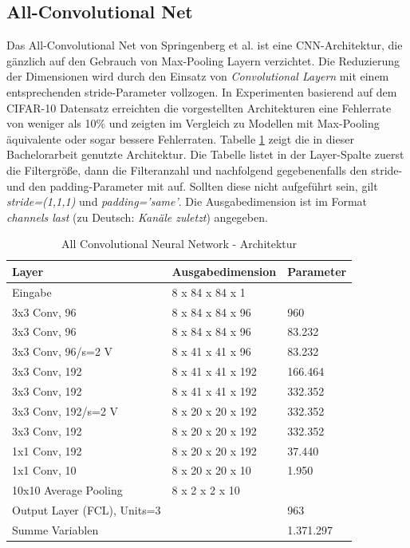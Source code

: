  
\subsection{All-Convolutional Net}
Das All-Convolutional Net von Springenberg et al. \parencite{DBLP:journals/corr/SpringenbergDBR14} ist eine CNN-Architektur, die g\"anzlich auf den Gebrauch von Max-Pooling Layern verzichtet. Die Reduzierung der Dimensionen wird durch den Einsatz von \textit{Convolutional Layern} mit einem entsprechenden stride-Parameter vollzogen. In Experimenten basierend auf dem CIFAR-10 Datensatz erreichten die vorgestellten Architekturen eine Fehlerrate von weniger als 10\% und zeigten im Vergleich zu Modellen mit Max-Pooling äquivalente oder sogar bessere Fehlerraten. Tabelle \ref{tb:arch_allcnn} zeigt die in dieser Bachelorarbeit genutzte Architektur. Die Tabelle listet in der Layer-Spalte zuerst die Filtergr\"o\ss{}e, dann die Filteranzahl und nachfolgend gegebenenfalls den stride- und den padding-Parameter mit auf. Sollten diese nicht aufgef\"uhrt sein, gilt \textit{stride=(1,1,1)} und \textit{padding='same'}. Die Ausgabedimension ist im Format \textit{channels last} (zu Deutsch: \textit{Kanäle zuletzt}) angegeben. 

\begin{table}
\centering
\caption{All Convolutional Neural Network - Architektur}
\begin{tabular}{@{}lll@{}}
\hline
Layer & Ausgabedimension & Parameter\\
\hline
Eingabe & 8 x 84 x 84 x 1 & \\
3x3 Conv, 96 & 8 x 84 x 84 x 96 & 960\\
3x3 Conv, 96 & 8 x 84 x 84 x 96 & 83.232\\ 
3x3 Conv, 96/s=2 V & 8 x 41 x 41 x 96 & 83.232\\ 
3x3 Conv, 192 & 8 x 41 x 41 x 192 & 166.464\\
3x3 Conv, 192 & 8 x 41 x 41 x 192 & 332.352\\
3x3 Conv, 192/s=2 V & 8 x 20 x 20 x 192 & 332.352\\
3x3 Conv, 192 & 8 x 20 x 20 x 192 & 332.352\\
1x1 Conv, 192 & 8 x 20 x 20 x 192 & 37.440\\
1x1 Conv, 10 & 8 x 20 x 20 x 10 & 1.950\\
10x10 Average Pooling & 8 x 2 x 2 x 10 & \\
Output Layer (FCL), Units=3 & & 963\\
\hline
Summe Variablen & & 1.371.297\\
\hline
\end{tabular}
\label{tb:arch_allcnn}
\end{table}


